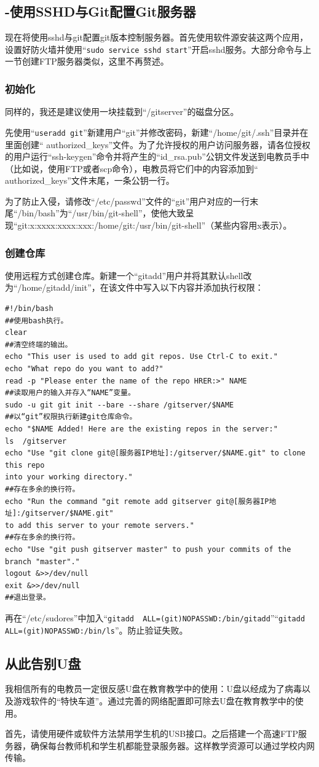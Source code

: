 \subsection{-使用SSHD与Git配置Git服务器}
现在将使用sshd与git配置git版本控制服务器。首先使用软件源安装这两个应用，设置好防火墙并使用“\verb|sudo service sshd start|”开启sshd服务。大部分命令与上一节创建FTP服务器类似，这里不再赘述。
\subsubsection{初始化}
同样的，我还是建议使用一块挂载到“/gitserver”的磁盘分区。\par
先使用“\verb|useradd git|”新建用户“git”并修改密码，新建“/home/git/.ssh”目录并在里面创建“ authorized\_keys”文件。为了允许授权的用户访问服务器，请各位授权的用户运行“ssh-keygen”命令并将产生的“id\_rsa.pub”公钥文件发送到电教员手中（比如说，使用FTP或者scp命令），电教员将它们中的内容添加到“ authorized\_keys”文件末尾，一条公钥一行。\par
为了防止入侵，请修改“/etc/passwd”文件的“git”用户对应的一行末尾“/bin/bash”为“/usr/bin/git-shell”，使他大致呈现“git:x:xxxx:xxxx:xxx:/home/git:/usr/bin/git-shell”（某些内容用x表示）。
\subsubsection{创建仓库}
使用远程方式创建仓库。新建一个“gitadd”用户并将其默认shell改为“/home/gitadd/init”，在该文件中写入以下内容并添加执行权限：
\begin{verbatim}
#!/bin/bash
##使用bash执行。
clear
##清空终端的输出。
echo "This user is used to add git repos. Use Ctrl-C to exit."
echo "What repo do you want to add?"
read -p "Please enter the name of the repo HRER:>" NAME
##读取用户的输入并存入“NAME”变量。
sudo -u git git init --bare --share /gitserver/$NAME
##以“git”权限执行新建git仓库命令。
echo "$NAME Added! Here are the existing repos in the server:"
ls  /gitserver
echo "Use "git clone git@[服务器IP地址]:/gitserver/$NAME.git" to clone this repo 
into your working directory."
##存在多余的换行符。
echo "Run the command "git remote add gitserver git@[服务器IP地址]:/gitserver/$NAME.git" 
to add this server to your remote servers."
##存在多余的换行符。
echo "Use "git push gitserver master" to push your commits of the branch "master"."
logout &>>/dev/null
exit &>>/dev/null
##退出登录。
\end{verbatim}
再在“/etc/sudores”中加入“\verb|gitadd  ALL=(git)NOPASSWD:/bin/gitadd|”“\verb|gitadd  ALL=(git)NOPASSWD:/bin/ls|”。防止验证失败。
\subsection{从此告别U盘}
我相信所有的电教员一定很反感U盘在教育教学中的使用：U盘以经成为了病毒以及游戏软件的“特快车道”。通过完善的网络配置即可除去U盘在教育教学中的使用。\par
首先，请使用硬件或软件方法禁用学生机的USB接口。之后搭建一个高速FTP服务器，确保每台教师机和学生机都能登录服务器。这样教学资源可以通过学校内网传输。